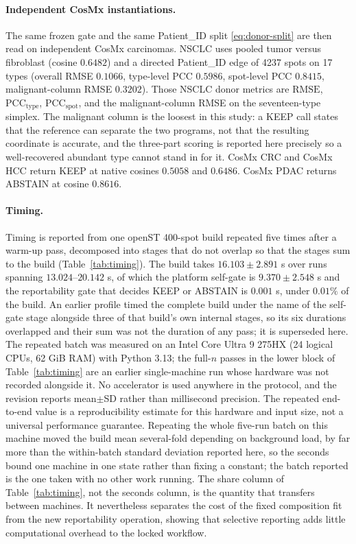\paragraph{Independent CosMx instantiations.}
The same frozen gate and the same Patient\_ID split \eqref{eq:donor-split} are then read on independent CosMx carcinomas. NSCLC uses pooled tumor versus fibroblast (cosine \(0.6482\)) and a directed Patient\_ID edge of 4237 spots on 17 types (overall RMSE \(0.1066\), type-level PCC \(0.5986\), spot-level PCC \(0.8415\), malignant-column RMSE \(0.3202\)). Those NSCLC donor metrics are \(\mathrm{RMSE}\), \(\mathrm{PCC}_{\mathrm{type}}\), \(\mathrm{PCC}_{\mathrm{spot}}\), and the malignant-column RMSE on the seventeen-type simplex. The malignant column is the loosest in this study: a KEEP call states that the reference can separate the two programs, not that the resulting coordinate is accurate, and the three-part scoring is reported here precisely so a well-recovered abundant type cannot stand in for it. CosMx CRC and CosMx HCC return KEEP at native cosines \(0.5058\) and \(0.6486\). CosMx PDAC returns ABSTAIN at cosine \(0.8616\).

\paragraph{Timing.}
Timing is reported from one openST 400-spot build repeated five times after a warm-up pass, decomposed into stages that do not overlap so that the stages sum to the build (Table~\ref{tab:timing}). The build takes \(16.103\pm2.891\) s over runs spanning \(13.024\)--\(20.142\) s, of which the platform self-gate is \(9.370\pm2.548\) s and the reportability gate that decides KEEP or ABSTAIN is \(0.001\) s, under \(0.01\%\) of the build. An earlier profile timed the complete build under the name of the self-gate stage alongside three of that build's own internal stages, so its six durations overlapped and their sum was not the duration of any pass; it is superseded here. The repeated batch was measured on an Intel Core Ultra 9 275HX (24 logical CPUs, 62 GiB RAM) with Python 3.13; the full-\(n\) passes in the lower block of Table~\ref{tab:timing} are an earlier single-machine run whose hardware was not recorded alongside it. No accelerator is used anywhere in the protocol, and the revision reports mean\(\pm\)SD rather than millisecond precision. The repeated end-to-end value is a reproducibility estimate for this hardware and input size, not a universal performance guarantee. Repeating the whole five-run batch on this machine moved the build mean several-fold depending on background load, by far more than the within-batch standard deviation reported here, so the seconds bound one machine in one state rather than fixing a constant; the batch reported is the one taken with no other work running. The share column of Table~\ref{tab:timing}, not the seconds column, is the quantity that transfers between machines. It nevertheless separates the cost of the fixed composition fit from the new reportability operation, showing that selective reporting adds little computational overhead to the locked workflow.

